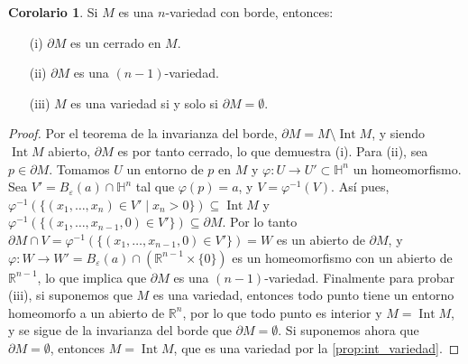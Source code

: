 \documentclass[10pt]{report}
\newcommand{\R}{\mathbb{R}}
\DeclareMathOperator{\interior}{Int} %
\theoremstyle{definition}
\newtheorem{corol}[defin]{Corolario}
\begin{document}
\begin{corol}\label{corol:borde_n-1_variedad}
Si $M$ es una $n$-variedad con borde, entonces:
\begin{itemize}
\item[(i)]  $\partial M$ es un cerrado en $M$.
\item[(ii)] $\partial M$ es una $(n-1)$-variedad. 
\item[(iii)] $M$ es una variedad si y solo si $\partial M=\emptyset$.
\end{itemize}
\end{corol}

\begin{proof}
Por el teorema de la invarianza del borde, $\partial M= M\setminus \interior{M}$, y siendo $\interior{M}$ abierto, $\partial M$ es por tanto cerrado, lo que demuestra (i). 
Para (ii), sea $p\in \partial M$. Tomamos $U$ un entorno de $p$ en $M$ y $\varphi : U\to U'\subset \mathbb{H}^n$ un homeomorfismo. Sea $V'=B_{\varepsilon}(a)\cap \mathbb{H}^n$ tal que $\varphi(p)=a$, y $V=\varphi^{-1} (V)$.
Así pues, $\varphi^{-1} (\{(x_1,\dots ,x_n)\in V' \mid x_{n}>0\})\subseteq \interior M$  y $\varphi^{-1} (\{(x_1,\dots ,x_{n-1},0)\in V'\})\subseteq \partial M$. Por lo tanto $\partial M\cap V=\varphi^{-1} (\{(x_1,\dots ,x_{n-1},0)\in V'\})=W$ es un abierto de $\partial M$, y $\varphi : W\to W'=B_{\varepsilon}(a)\cap (\R^{n-1} \times \{ 0\} )$ es un homeomorfismo con un abierto de $\R^{n-1}$, lo que implica que $\partial M$ es una $(n-1)$-variedad.
Finalmente para probar (iii), si suponemos que $M$ es una variedad, entonces todo punto tiene un entorno homeomorfo a un abierto de $\R^n$, por lo que todo punto es interior y $M=\interior{M}$, y se sigue de la invarianza del borde que $\partial M=\emptyset$. Si suponemos ahora que $\partial M=\emptyset$, entonces $M=\interior{M}$, que es una variedad por la \autoref{prop:int_variedad}.
\end{proof}
\end{document}
